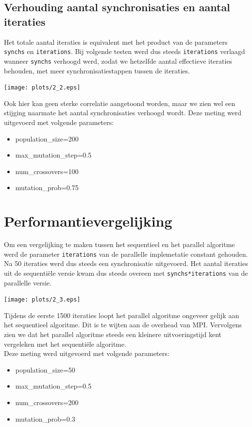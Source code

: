 \documentclass[]{article}
\begin{document}
\subsection{Verhouding aantal synchronisaties en aantal iteraties}
Het totale aantal iteraties is equivalent met het product van de parameters \texttt{synchs} en \texttt{iterations}. 
Bij volgende testen werd dus steeds \texttt{iterations} verlaagd wanneer \texttt{synchs} verhoogd werd, zodat we hetzelfde
aantal effectieve iteraties behouden, met meer synchronisatiestappen tussen de iteraties.
\begin{center}\texttt{[image: plots/2\_2.eps]}\end{center}
Ook hier kan geen sterke correlatie aangetoond worden, maar we zien wel een stijging naarmate het aantal synchronisaties verhoogd wordt.
Deze meting werd uitgevoerd met volgende parameters:
\begin{itemize}
\item population\_size=200
\item max\_mutation\_step=0.5
\item num\_crossovers=100 
\item mutation\_prob=0.75
\end{itemize}

\section{Performantievergelijking}
Om een vergelijking te maken tussen het sequentieel en het parallel algoritme werd de parameter \texttt{iterations} van de parallelle implemetatie
constant gehouden. Na 50 iteraties werd dus steeds een synchronisatie uitgevoerd. Het aantal iteraties uit de sequenti\"ele versie kwam dus steeds overeen met
\texttt{synchs*iterations} van de parallelle versie.
\begin{center}\texttt{[image: plots/2\_3.eps]}\end{center}
Tijdens de eerste 1500 iteraties loopt het parallel algoritme ongeveer gelijk aan het sequentieel algoritme. Dit is te wijten aan de overhead van MPI.
Vervolgens zien we dat het parallel algoritme steeds een kleinere uitvoeringstijd kent vergeleken met het sequenti\"ele algoritme.\\
Deze meting werd uitgevoerd met volgende parameters:
\begin{itemize}
\item population\_size=50
\item max\_mutation\_step=0.5
\item num\_crossovers=200 
\item mutation\_prob=0.3
\end{itemize}
\end{document}
